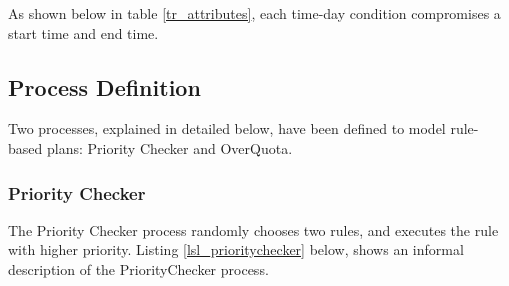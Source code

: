 \begin{table}[H]
\begin{center}
\end{center}
\caption{\emph{Time{\_}of{\_}day} Attribute definitions. }
\label{tod_attributes}
\end{table}
As shown below in table \ref{tr_attributes}, each time-day condition compromises a start time and end time. 
\begin{table}[H]
\begin{center}
\end{center}
\caption{\emph{Time Range} Attribute definitions. }
\label{tr_attributes}
\end{table}

\subsection{Process Definition}
\noindent
Two processes, explained in detailed below, have been defined to model rule-based plans: Priority Checker and OverQuota.

\subsubsection{Priority Checker}
\noindent
The Priority Checker process randomly chooses two rules, and executes the rule with higher priority. Listing \ref{lsl_prioritychecker} below, shows an informal description of the PriorityChecker process. \\

